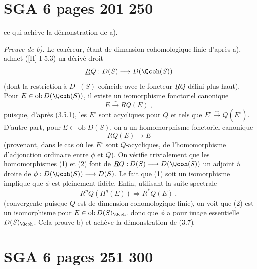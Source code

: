 \clearpage
{}
\section*{SGA 6 pages 201 250}
\setcounter{page}{201}



ce qui achève la démonstration de a).

\smallskip
\noindent\textit{Preuve de b).} Le cohéreur, étant de dimension cohomologique finie d'après a), admet ([H] I 5.3) un dérivé droit
\[
\underline{R}Q : D(S) \longrightarrow D(\Qcoh(S))
\]
(dont la restriction à $D^{+}(S)$ coïncide avec le foncteur $\underline{R}Q$ défini plus haut). Pour $E \in \operatorname{ob} D(\Qcoh(S))$, il existe un isomorphisme fonctoriel canonique
\begin{equation}\tag{1}
E \xrightarrow{\sim} \underline{R}Q(E)\ ,\end{equation}
puisque, d'après (3.5.1), les $E^{i}$ sont acycliques pour $Q$ et tels que $E^{i} \xrightarrow{\sim} Q(E^{i})$. D'autre part, pour $E \in \operatorname{ob} D(S)$, on a un homomorphisme fonctoriel canonique
\begin{equation}\tag{2}
\underline{R}Q(E) \longrightarrow E\end{equation}
(provenant, dans le cas où les $E^{i}$ sont $Q$-acycliques, de l'homomorphisme d'adjonction ordinaire entre $\phi$ et $Q$). On vérifie trivialement que les homomorphismes (1) et (2) font de $\underline{R}Q : D(S) \longrightarrow D(\Qcoh(S))$ un adjoint à droite de $\phi : D(\Qcoh(S)) \longrightarrow D(S)$. Le fait que (1) soit un isomorphisme implique que $\phi$ est pleinement fidèle. Enfin, utilisant la suite spectrale
\[
R^{p}Q(H^{q}(E)) \Longrightarrow R^{*}Q(E)\ ,\]
(convergente puisque $Q$ est de dimension cohomologique finie), on voit que (2) est un isomorphisme pour $E \in \operatorname{ob} D(S)_{\Qcoh}$, donc que $\phi$ a pour image essentielle $D(S)_{\Qcoh}$. Cela prouve b) et achève la démonstration de (3.7).

\newpage


\clearpage
{}
\section*{SGA 6 pages 251 300}
\setcounter{page}{251}

